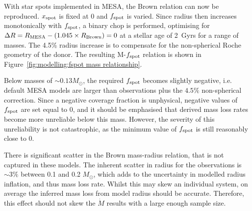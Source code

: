 With star spots implemented in MESA, the Brown relation can now be reproduced.
$x_{\rm spot}$ is fixed at 0 and $f_{\rm spot}$ is varied.
Since radius then increases monotonically with $f_{\rm spot}$, a binary chop is performed, optimising for $\Delta R = R_{\rm MESA} - (1.045\times R_{\rm Brown}) = 0$ at a stellar age of 2~Gyrs for a range of masses. The 4.5\% radius increase is to compensate for the non-spherical Roche geometry of the donor.
The resulting M-$f_{\rm spot}$ relation is shown in Figure~\ref{fig:modelling:fspot mass relationship}.

Below masses of $\sim 0.13 M_\odot$, the required $f_{\rm spot}$ becomes slightly negative, i.e. default MESA models are larger than observations plus the $4.5\%$ non-spherical correction.
Since a negative coverage fraction is unphysical, negative values of $f_{\rm spot}$ are set equal to 0, and it should be emphasised that derived mass loss rates become more unreliable below this mass.
However, the severity of this unreliability is not catastrophic, as the minimum value of $f_{\rm spot}$ is still reasonably close to 0.

There is significant scatter in the Brown mass-radius relation, that is not captured in these models. The inherent scatter in radius for the observations is $\sim 3\%$ between 0.1 and 0.2 $M_\odot$, which adds to the uncertainty in modelled radius inflation, and thus mass loss rate.
Whilst this may skew an individual system, on average the inferred mass loss from model radius should be accurate. Therefore, this effect should not skew the $\dot M$ results with a large enough sample size.

